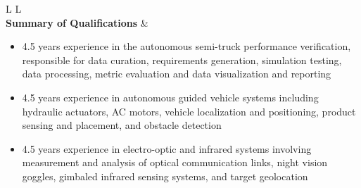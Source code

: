 \begin{tabular}{L{\lcolw}  L{\rcolw}}
 \hline \hline \\
\textbf{\Large Summary of Qualifications} &
\vspace{-0.3in} 
    \begin{itemize}[leftmargin = \itemmargin]

	\item 4.5 years experience in the autonomous semi-truck performance verification, responsible for data curation, requirements generation, simulation testing, data processing, metric evaluation
	and data visualization and reporting
		
	\item 4.5 years experience in autonomous guided vehicle systems including hydraulic actuators, AC motors, vehicle localization and positioning, 
	product sensing and placement, and obstacle detection

	\item 4.5 years experience in electro-optic and infrared systems involving measurement and analysis of optical communication links, 
	night vision goggles, gimbaled infrared sensing systems, and target geolocation
	
	\end{itemize}\\
 \hline \\ 
\end{tabular}